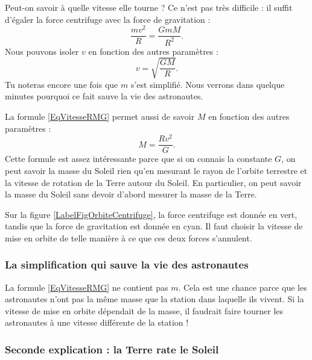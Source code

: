 Peut-on savoir à quelle vitesse elle tourne ? Ce n'est pas très difficile : il suffit d'égaler la force centrifuge avec la force de gravitation :
\begin{equation}
	\frac{ mv^2 }{ R }=\frac{ GmM }{ R^2 }.
\end{equation}
Nous pouvons isoler $v$ en fonction des autres paramètres :
\begin{equation}			\label{EqVitesseRMG}
	v=\sqrt{\frac{ GM }{ R }}.
\end{equation}
Tu noteras encore une fois que $m$ s'est simplifié. Nous verrons dans quelque minutes pourquoi ce fait sauve la vie des astronautes.

La formule \eqref{EqVitesseRMG} permet aussi de savoir $M$ en fonction des autres paramètres :
\begin{equation}
	M=\frac{ Rv^2 }{ G }.
\end{equation}
Cette formule est assez intéressante parce que si on connais la constante $G$, on peut savoir la masse du Soleil rien qu'en mesurant le rayon de l'orbite terrestre et la vitesse de rotation de la Terre autour du Soleil. En particulier, on peut savoir la masse du Soleil sans devoir d'abord mesurer la masse de la Terre.

Sur la figure \ref{LabelFigOrbiteCentrifuge}, la force centrifuge est donnée en vert, tandis que la force de gravitation est donnée en cyan. Il faut choisir la vitesse de mise en orbite de telle manière à ce que ces deux forces s'annulent.
\newcommand{\CaptionFigOrbiteCentrifuge}{L'art de la mise en orbite est de donner la vitesse exacte qu'il faut pour que la force de gravitation soit exactement compensée par la force centrifuge.}


\subsubsection{La simplification qui sauve la vie des astronautes}

La formule \eqref{EqVitesseRMG} ne contient pas $m$. Cela est une chance parce que les astronautes n'ont pas la même masse que la station dans laquelle ils vivent. Si la vitesse de mise en orbite dépendait de la masse, il faudrait faire tourner les astronautes à une vitesse différente de la station ! 

\subsubsection{Seconde explication : la Terre \og rate\fg{} le Soleil}




